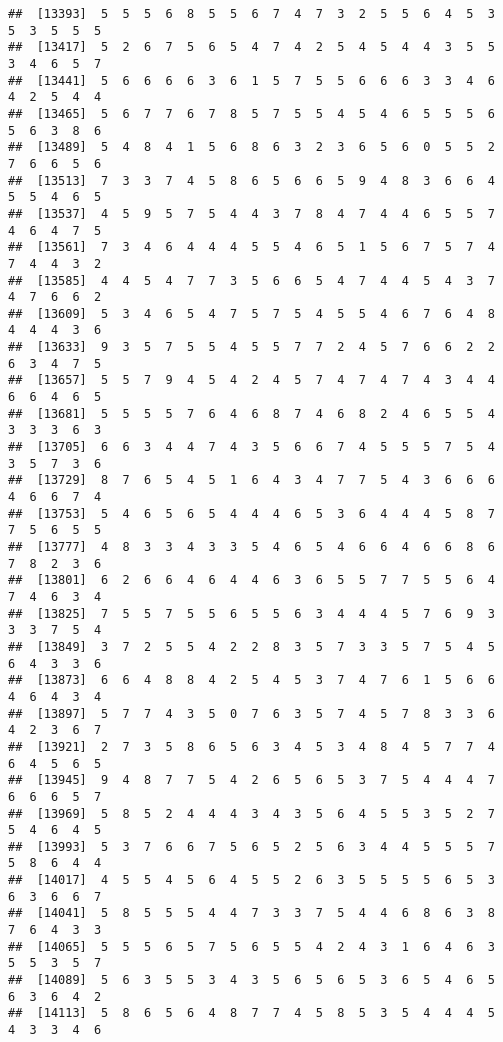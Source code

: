 \documentclass[
]{book}
\begin{document}
\begin{verbatim}
##  [13393]  5  5  5  6  8  5  5  6  7  4  7  3  2  5  5  6  4  5  3  5  3  5  5  5
##  [13417]  5  2  6  7  5  6  5  4  7  4  2  5  4  5  4  4  3  5  5  3  4  6  5  7
##  [13441]  5  6  6  6  6  3  6  1  5  7  5  5  6  6  6  3  3  4  6  4  2  5  4  4
##  [13465]  5  6  7  7  6  7  8  5  7  5  5  4  5  4  6  5  5  5  6  5  6  3  8  6
##  [13489]  5  4  8  4  1  5  6  8  6  3  2  3  6  5  6  0  5  5  2  7  6  6  5  6
##  [13513]  7  3  3  7  4  5  8  6  5  6  6  5  9  4  8  3  6  6  4  5  5  4  6  5
##  [13537]  4  5  9  5  7  5  4  4  3  7  8  4  7  4  4  6  5  5  7  4  6  4  7  5
##  [13561]  7  3  4  6  4  4  4  5  5  4  6  5  1  5  6  7  5  7  4  7  4  4  3  2
##  [13585]  4  4  5  4  7  7  3  5  6  6  5  4  7  4  4  5  4  3  7  4  7  6  6  2
##  [13609]  5  3  4  6  5  4  7  5  7  5  4  5  5  4  6  7  6  4  8  4  4  4  3  6
##  [13633]  9  3  5  7  5  5  4  5  5  7  7  2  4  5  7  6  6  2  2  6  3  4  7  5
##  [13657]  5  5  7  9  4  5  4  2  4  5  7  4  7  4  7  4  3  4  4  6  6  4  6  5
##  [13681]  5  5  5  5  7  6  4  6  8  7  4  6  8  2  4  6  5  5  4  3  3  3  6  3
##  [13705]  6  6  3  4  4  7  4  3  5  6  6  7  4  5  5  5  7  5  4  3  5  7  3  6
##  [13729]  8  7  6  5  4  5  1  6  4  3  4  7  7  5  4  3  6  6  6  4  6  6  7  4
##  [13753]  5  4  6  5  6  5  4  4  4  6  5  3  6  4  4  4  5  8  7  7  5  6  5  5
##  [13777]  4  8  3  3  4  3  3  5  4  6  5  4  6  6  4  6  6  8  6  7  8  2  3  6
##  [13801]  6  2  6  6  4  6  4  4  6  3  6  5  5  7  7  5  5  6  4  7  4  6  3  4
##  [13825]  7  5  5  7  5  5  6  5  5  6  3  4  4  4  5  7  6  9  3  3  3  7  5  4
##  [13849]  3  7  2  5  5  4  2  2  8  3  5  7  3  3  5  7  5  4  5  6  4  3  3  6
##  [13873]  6  6  4  8  8  4  2  5  4  5  3  7  4  7  6  1  5  6  6  4  6  4  3  4
##  [13897]  5  7  7  4  3  5  0  7  6  3  5  7  4  5  7  8  3  3  6  4  2  3  6  7
##  [13921]  2  7  3  5  8  6  5  6  3  4  5  3  4  8  4  5  7  7  4  6  4  5  6  5
##  [13945]  9  4  8  7  7  5  4  2  6  5  6  5  3  7  5  4  4  4  7  6  6  6  5  7
##  [13969]  5  8  5  2  4  4  4  3  4  3  5  6  4  5  5  3  5  2  7  5  4  6  4  5
##  [13993]  5  3  7  6  6  7  5  6  5  2  5  6  3  4  4  5  5  5  7  5  8  6  4  4
##  [14017]  4  5  5  4  5  6  4  5  5  2  6  3  5  5  5  5  6  5  3  6  3  6  6  7
##  [14041]  5  8  5  5  5  4  4  7  3  3  7  5  4  4  6  8  6  3  8  7  6  4  3  3
##  [14065]  5  5  5  6  5  7  5  6  5  5  4  2  4  3  1  6  4  6  3  5  5  3  5  7
##  [14089]  5  6  3  5  5  3  4  3  5  6  5  6  5  3  6  5  4  6  5  6  3  6  4  2
##  [14113]  5  8  6  5  6  4  8  7  7  4  5  8  5  3  5  4  4  4  5  4  3  3  4  6

\end{verbatim}
\end{document}
